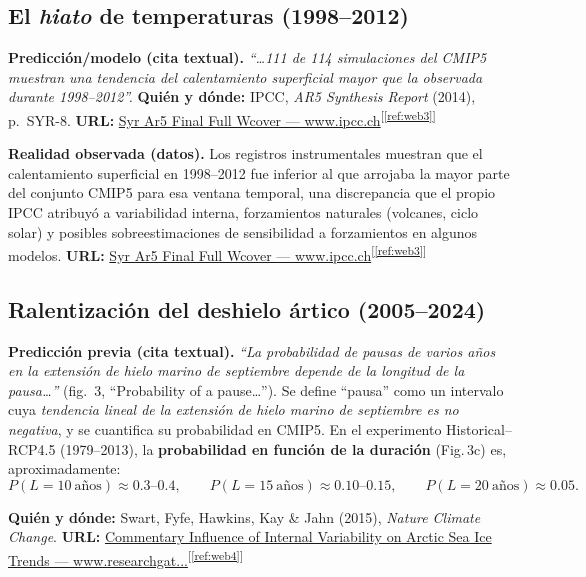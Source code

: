 \documentclass[
  10pt,
  a4paper,
  DIV=11,
  numbers=noendperiod,
  open=any]{scrreprt}
\numberwithin{equation}{chapter}
\numberwithin{equation}{section}
\renewcommand{\[}{\begin{equation}}
\renewcommand{\]}{\end{equation}}
\newcommand{\refweb}[3]{%
  \href{#1}{#2}\textsuperscript{[\ref{ref:#3}]}%
}
\begin{document}
\subsection{El \textit{hiato} de temperaturas (1998–2012)}

\textbf{Predicción/modelo (cita textual).}
\emph{“\dots{}111 de 114 simulaciones del CMIP5 muestran una tendencia del calentamiento superficial mayor que la observada durante 1998–2012”.}
\textbf{Quién y dónde:} IPCC, \textit{AR5 Synthesis Report} (2014), p.~SYR-8.
\textbf{URL:} \refweb{https://www.ipcc.ch/site/assets/uploads/2018/05/SYR_AR5_FINAL_full_wcover.pdf}{Syr Ar5 Final Full Wcover — www.ipcc.ch}{web3}

\textbf{Realidad observada (datos).}
Los registros instrumentales muestran que el calentamiento superficial en 1998–2012 fue inferior al que arrojaba la mayor parte del conjunto CMIP5 para esa ventana temporal, una discrepancia que el propio IPCC atribuyó a variabilidad interna, forzamientos naturales (volcanes, ciclo solar) y posibles sobreestimaciones de sensibilidad a forzamientos en algunos modelos.
\textbf{URL:} \refweb{https://www.ipcc.ch/site/assets/uploads/2018/05/SYR_AR5_FINAL_full_wcover.pdf}{Syr Ar5 Final Full Wcover — www.ipcc.ch}{web3}

\medskip

\subsection{Ralentización del deshielo ártico (2005–2024)}

\textbf{Predicción previa (cita textual).}
\emph{“La probabilidad de pausas de varios años en la extensión de hielo marino de septiembre depende de la longitud de la pausa\ldots{}”} (fig.~3, “Probability of a pause\ldots{}”). Se define “pausa” como un intervalo cuya \emph{tendencia lineal de la extensión de hielo marino de septiembre es no negativa}, y se cuantifica su probabilidad en CMIP5. En el experimento Historical--RCP4.5 (1979--2013), la \textbf{probabilidad en función de la duración} (Fig.\,3c) es, aproximadamente:
\[
P(L{=}10~\text{años}) \approx 0.3\text{--}0.4,\qquad
P(L{=}15~\text{años}) \approx 0.10\text{--}0.15,\qquad
P(L{=}20~\text{años}) \approx 0.05.
\]


\textbf{Quién y dónde:} Swart, Fyfe, Hawkins, Kay \& Jahn (2015), \textit{Nature Climate Change}.
\textbf{URL:} \refweb{https://www.researchgate.net/profile/Jennifer-Kay-7/publication/276333917_COMMENTARY_Influence_of_internal_variability_on_Arctic_sea-ice_trends/links/5d6738cc299bf11adf298934/COMMENTARY-Influence-of-internal-variability-on-Arctic-sea-ice-trends.pdf}{Commentary Influence of Internal Variability on Arctic Sea Ice Trends — www.researchgat...}{web4}
\end{document}
